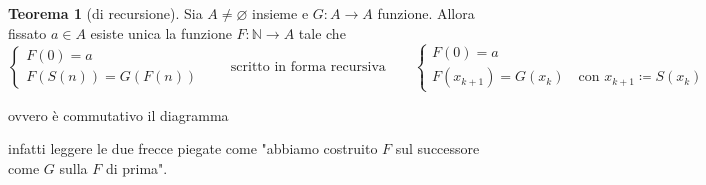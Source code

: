 \documentclass[a4paper,10pt]{article}
\theoremstyle{definition}
\theoremstyle{indentdefinition}
\theoremstyle{indentpostulate}
\theoremstyle{indenttheorem}
\newtheorem{thm}{Teorema}[section]
\theoremstyle{myremark}
\theoremstyle{indentgeneral}
\newenvironment{myboxed} 
{\noindent\begin{lrbox}{\mybox}\begin{minipage}{\textwidth}}
{\end{minipage}\end{lrbox}\fbox{\usebox{\mybox}}}
\begin{document}
\begin{myboxed}
\begin{thm}[di recursione]\label{thm-recursione}
    Sia $A\ne \varnothing$ insieme e $G: A\to A$ funzione. Allora fissato $a\in A$ esiste unica la funzione $F:\mathbb{N}\to A $ tale che
    $$\begin{cases}
    F(0)= a\\
    F(S(n))=G(F(n))
\end{cases} \qquad \text{scritto in forma recursiva} \qquad \begin{cases}
    F(0)=a \\
    F(x_{k+1})=G(x_k) \quad \text{con }x_{k+1}\coloneqq S(x_k)
\end{cases}$$
\end{thm}
\end{myboxed}
ovvero è commutativo il diagramma
 infatti leggere le due frecce piegate come "abbiamo costruito $F$ sul successore come $G$ sulla $F$ di prima".
\end{document}
